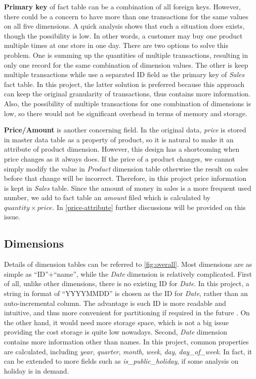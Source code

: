 \documentclass[
  a4paper,
]{article}
\begin{document}
\textbf{Primary key} of fact table can be a combination of all foreign
keys. However, there could be a concern to have more than one
transactions for the same values on all five dimensions. A quick
analysis shows that such a situation does exists, though the possibility
is low. In other words, a customer may buy one product multiple times at
one store in one day. There are two options to solve this problem. One
is summing up the quantities of multiple transactions, resulting in only
one record for the same combination of dimension values. The other is
keep multiple transactions while use a separated ID field as the primary
key of \emph{Sales} fact table. In this project, the latter solution is
preferred because this approach can keep the original granularity of
transactions, thus contains more information. Also, the possibility of
multiple transactions for one combination of dimensions is low, so there
would not be significant overhead in terms of memory and storage.

\textbf{Price/Amount} is another concerning field. In the original data,
\emph{price} is stored in master data table as a property of product, so
it is natural to make it an attribute of product dimension. However,
this design has a shortcoming when price changes as it always does. If
the price of a product changes, we cannot simply modify the value in
\emph{Product} dimension table otherwise the result on sales before that
change will be incorrect. Therefore, in this project price information
is kept in \emph{Sales} table. Since the amount of money in sales is a
more frequent used number, we add to fact table an \emph{amount} filed
which is calculated by \(\mathit{quantity}\times \mathit{price}\). In
\cref{price-attribute} further discussions will be provided on this
issue.

\hypertarget{dimensions}{%
\subsection{Dimensions}\label{dimensions}}

Details of dimension tables can be referred to \cref{fig:overall}. Most
dimensions are as simple as ``ID''+``name'', while the \emph{Date}
dimension is relatively complicated. First of all, unlike other
dimensions, there is no existing ID for \emph{Date}. In this project, a
string in format of ``YYYYMMDD'' is chosen as the ID for \emph{Date},
rather than an auto-incremental column. The advantage is such ID is more
readable and intuitive, and thus more convenient for partitioning if
required in the future \autocite{dinesh_create_nodate}. On the other
hand, it would need more storage space, which is not a big issue
providing the cost storage is quite low nowadays. Second, \emph{Date}
dimension contains more information other than names. In this project,
common properties are calculated, including \emph{year}, \emph{quarter},
\emph{month}, \emph{week}, \emph{day}, \emph{day\_of\_week}. In fact, it
can be extended to more fields such as \emph{is\_public\_holiday}, if
some analysis on holiday is in demand.
\end{document}
